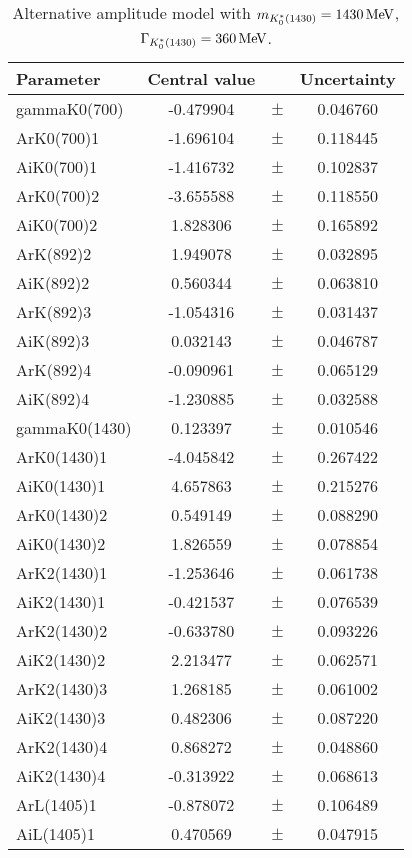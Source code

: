 \clearpage

\begin{table}
\centering
\caption{Alternative amplitude model with $m_{K^*_0(1430)} = 1430 \text{\,Me\kern -0.1em V}$, $\Gamma_{K^*_0(1430)} = 360 \text{\,Me\kern -0.1em V}$.}
\begin{tiny}
\begin{tabular}{lccc}
\toprule
Parameter & Central value & & Uncertainty\\
\midrule
gammaK0(700) & -0.479904 & $\pm$ & 0.046760 \\
ArK0(700)1 & -1.696104 & $\pm$ & 0.118445 \\
AiK0(700)1 & -1.416732 & $\pm$ & 0.102837 \\
ArK0(700)2 & -3.655588 & $\pm$ & 0.118550 \\
AiK0(700)2 & 1.828306 & $\pm$ & 0.165892 \\
ArK(892)2 & 1.949078 & $\pm$ & 0.032895 \\
AiK(892)2 & 0.560344 & $\pm$ & 0.063810 \\
ArK(892)3 & -1.054316 & $\pm$ & 0.031437 \\
AiK(892)3 & 0.032143 & $\pm$ & 0.046787 \\
ArK(892)4 & -0.090961 & $\pm$ & 0.065129 \\
AiK(892)4 & -1.230885 & $\pm$ & 0.032588 \\
gammaK0(1430) & 0.123397 & $\pm$ & 0.010546 \\
ArK0(1430)1 & -4.045842 & $\pm$ & 0.267422 \\
AiK0(1430)1 & 4.657863 & $\pm$ & 0.215276 \\
ArK0(1430)2 & 0.549149 & $\pm$ & 0.088290 \\
AiK0(1430)2 & 1.826559 & $\pm$ & 0.078854 \\
ArK2(1430)1 & -1.253646 & $\pm$ & 0.061738 \\
AiK2(1430)1 & -0.421537 & $\pm$ & 0.076539 \\
ArK2(1430)2 & -0.633780 & $\pm$ & 0.093226 \\
AiK2(1430)2 & 2.213477 & $\pm$ & 0.062571 \\
ArK2(1430)3 & 1.268185 & $\pm$ & 0.061002 \\
AiK2(1430)3 & 0.482306 & $\pm$ & 0.087220 \\
ArK2(1430)4 & 0.868272 & $\pm$ & 0.048860 \\
AiK2(1430)4 & -0.313922 & $\pm$ & 0.068613 \\
ArL(1405)1 & -0.878072 & $\pm$ & 0.106489 \\
AiL(1405)1 & 0.470569 & $\pm$ & 0.047915 \\

\end{tabular}
\end{tiny}
\end{table}
